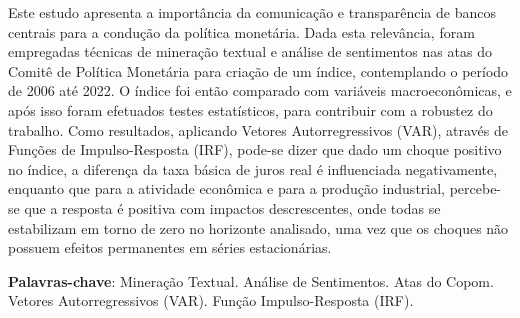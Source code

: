 
\setlength{\absparsep}{18pt} %
\begin{resumo}

Este estudo apresenta a importância da comunicação e transparência de bancos centrais para a condução da política monetária. Dada esta relevância, foram empregadas técnicas de mineração textual e análise de sentimentos nas atas do Comitê de Política Monetária para criação de um índice, contemplando o período de 2006 até 2022. O índice foi então comparado com variáveis macroeconômicas, e após isso foram efetuados testes estatísticos, para contribuir com a robustez do  trabalho. Como resultados, aplicando Vetores Autorregressivos (VAR), através de Funções de Impulso-Resposta (IRF), pode-se dizer que dado um choque positivo no índice, a diferença da taxa básica de juros real é influenciada negativamente, enquanto que para a atividade econômica e para a produção industrial, percebe-se que a resposta é positiva com impactos descrescentes, onde todas se estabilizam em torno de zero no horizonte analisado, uma vez que os choques não possuem efeitos permanentes em séries estacionárias. 


 \textbf{Palavras-chave}: Mineração Textual. Análise de Sentimentos. Atas do Copom. Vetores Autorregressivos (VAR). Função Impulso-Resposta (IRF).
\end{resumo}
